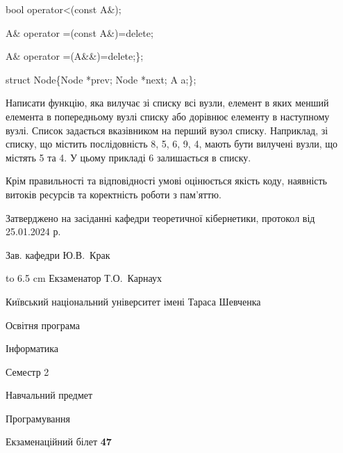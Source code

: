 \documentclass[12pt, ukrainian]{article}
\begin{document}
{\quad  bool operator<(const A\&); 

\quad A\& operator =(const A\&)=delete; 

\quad  A\& operator =(A\&\&)=delete;\};

struct Node\{Node *prev; Node *next; A a;\};

Написати функцію, яка вилучає зі списку всі вузли, елемент в яких менший елемента в попередньому вузлі списку або дорівнює елементу в наступному вузлі. Список задається вказівником на перший вузол списку. Наприклад, зі списку, що містить послідовність 8, 5, 6, 9, 4, мають бути вилучені вузли, що містять 5 та 4. У цьому прикладі 6 залишається в списку.

Крім правильності та відповідності умові оцінюється якість коду, наявність витоків ресурсів та коректність роботи з пам'яттю. 

}
{\smallskip\smallskip \begin {scriptsize} Затверджено на засіданні кафедри теоретичної кібернетики, протокол   від   25.01.2024 р.\par\smallskip\smallskip\smallskip\smallskip
{\parbox {6.5 cm} {Зав. кафедри \dotfill Ю.В.~Крак}}\hspace {0.7cm} {\hbox to 6.5 cm { Екзаменатор \dotfill Т.О.~Карнаух}} \end{scriptsize}}
\newpage
{{\begin {scriptsize}\par
{ \center  Київський національний університет імені Тараса Шевченка \par}
{\parbox {5 cm}{Освітня програма \hfill}{\parbox {7 cm}{Інформатика\hfill}}\parbox {6 cm}{\hfill Семестр 2}}\par
{\parbox {5 cm} {Навчальний предмет \hfill}\parbox {7 cm}{Програмування \hfill}\parbox {6cm}{\hfill}\par}\vspace{-15pt} \end{scriptsize}}{\center Екзаменаційний білет \No \textbf { 47 }\par}}
\end{document}
